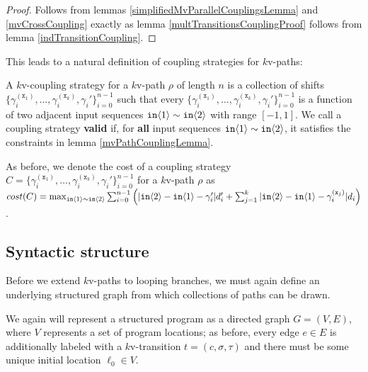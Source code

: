 \begin{proof}
    Follows from lemmas \ref{simplifiedMvParallelCouplingsLemma} and \ref{mvCrossCoupling} exactly as lemma \ref{multTransitionsCouplingProof} follows from lemma \ref{indTransitionCoupling}.
\end{proof}

This leads to a natural definition of coupling strategies for $k$v-paths:

\begin{defn}
    A $k$v-coupling strategy for a $k$v-path $\rho$ of length $n$ is a collection of shifts $\{\gamma_i^{(\texttt{x}_1)},\ldots, \gamma_i^{(\texttt{x}_k)}, \gamma_i'\}_{i=0}^{n-1}$ such that every $\{\gamma_i^{(\texttt{x}_1)},\ldots, \gamma_i^{(\texttt{x}_k)}, \gamma_i'\}_{i=0}^{n-1}$ is a function of two adjacent input sequences $\texttt{in}\langle1 \rangle\sim \texttt{in}\langle2 \rangle$ with range $[-1, 1]$. 
    We call a coupling strategy \textbf{valid} if, for \textbf{all} input sequences $\texttt{in}\langle1 \rangle\sim\texttt{in}\langle2 \rangle$, it satisfies the constraints in lemma \ref{mvPathCouplingLemma}.
\end{defn}

As before, we denote the cost of a coupling strategy $C=\{\gamma_i^{(\texttt{x}_1)},\ldots, \gamma_i^{(\texttt{x}_k)}, \gamma_i'\}_{i=0}^{n-1}$ for a $k$v-path $\rho$ as $cost(C) = \max_{\texttt{in}\langle1 \rangle\sim\texttt{in}\langle2 \rangle}\sum_{i=0}^{n-1}\left(|\texttt{in}\langle2 \rangle-\texttt{in}\langle1 \rangle-\gamma_i'|d_i'+\sum_{j=1}^k|\texttt{in}\langle2 \rangle-\texttt{in}\langle1 \rangle-\gamma_i^{(\texttt{x}_j)}|d_i\right)$.

\subsection{Syntactic structure}

Before we extend $k$v-paths to looping branches, we must again define an underlying structured graph from which collections of paths can be drawn.

We again will represent a structured program as a directed graph $G = (V, E)$, where $V$ represents a set of program locations; as before, every edge $e\in E$ is additionally labeled with a $k$v-transition $t = (c, \sigma, \tau)$ and there must be some unique initial location $\ell_0\in V$. 

